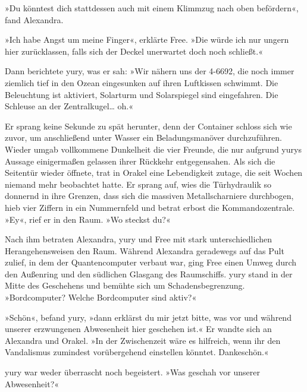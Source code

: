 »Du könntest dich stattdessen auch mit einem Klimmzug nach oben befördern«, fand Alexandra.

»Ich habe Angst um meine Finger«, erklärte Free. »Die würde ich nur ungern hier zurücklassen, falls sich der Deckel unerwartet doch noch schließt.«

Dann berichtete yury, was er sah: »Wir nähern uns der 4-6692, die noch immer ziemlich tief in den Ozean eingesunken auf ihren Luftkissen schwimmt. Die Beleuchtung ist aktiviert, Solarturm und Solarspiegel sind eingefahren. Die Schleuse an der Zentralkugel… oh.«

Er sprang keine Sekunde zu spät herunter, denn der Container schloss sich wie zuvor, um anschließend unter Wasser ein Beladungsmanöver durchzuführen. Wieder umgab vollkommene Dunkelheit die vier Freunde, die nur aufgrund yurys Aussage einigermaßen gelassen ihrer Rückkehr entgegensahen. Als sich die Seitentür wieder öffnete, trat in Orakel eine Lebendigkeit zutage, die seit Wochen niemand mehr beobachtet hatte. Er sprang auf, wies die Türhydraulik so donnernd in ihre Grenzen, dass sich die massiven Metallscharniere durchbogen, hieb vier Ziffern in ein Nummernfeld und betrat erbost die Kommandozentrale. »Ey«, rief er in den Raum. »Wo steckst du?«

Nach ihm betraten Alexandra, yury und Free mit stark unterschiedlichen Herangehensweisen den Raum. Während Alexandra geradewegs auf das Pult zulief, in dem der Quantencomputer verbaut war, ging Free einen Umweg durch den Außenring und den südlichen Glasgang des Raumschiffs. yury stand in der Mitte des Geschehens und bemühte sich um Schadensbegrenzung. »Bordcomputer? Welche Bordcomputer sind aktiv?«


»Schön«, befand yury, »dann erklärst du mir jetzt bitte, was vor und während unserer erzwungenen Abwesenheit hier geschehen ist.« Er wandte sich an Alexandra und Orakel. »In der Zwischenzeit wäre es hilfreich, wenn ihr den Vandalismus zumindest vorübergehend einstellen könntet. Dankeschön.«


yury war weder überrascht noch begeistert. »Was geschah vor unserer Abwesenheit?«

